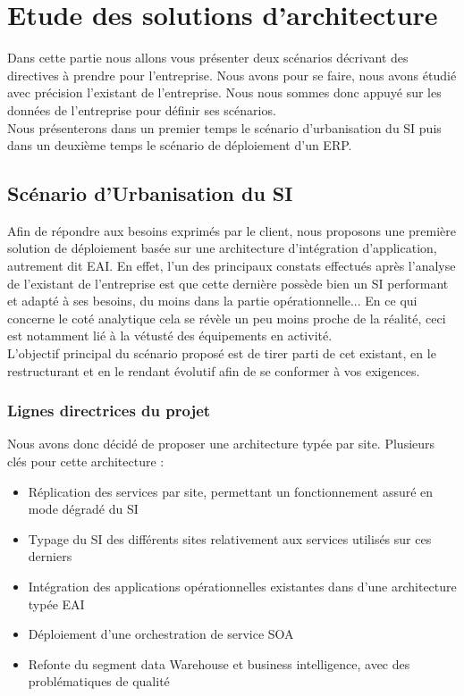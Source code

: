\section{Etude des solutions d'architecture}

Dans cette partie nous allons vous présenter deux scénarios décrivant des directives à prendre pour l'entreprise. Nous avons pour se faire, nous avons étudié avec précision l'existant de l'entreprise. Nous nous sommes donc appuyé sur les données de l'entreprise pour définir ses scénarios. \\
Nous présenterons dans un premier temps le scénario d'urbanisation du SI puis dans un deuxième temps le scénario de déploiement d'un ERP.

\subsection{Scénario d'Urbanisation du SI}

Afin de répondre aux besoins exprimés par le client, nous proposons une première solution de déploiement basée sur une architecture d'intégration d'application, autrement dit EAI. 
En effet, l'un des principaux constats effectués après l'analyse de l'existant de l'entreprise est que cette dernière possède bien un SI performant et adapté à ses besoins, du moins dans la partie opérationnelle... En ce qui concerne le coté analytique cela se révèle un peu moins proche de la réalité, ceci est notamment lié à la vétusté des équipements en activité.\\ 
L'objectif principal du scénario proposé est de tirer parti de cet existant, en le restructurant et en le rendant évolutif afin de se conformer à vos exigences.

\subsubsection{Lignes directrices du projet}

Nous avons donc décidé de proposer une architecture typée par site. Plusieurs clés pour cette architecture :\\

\begin{itemize}
\item Réplication des services par site, permettant un fonctionnement assuré en mode dégradé du SI
\item Typage du SI des différents sites relativement aux services utilisés sur ces derniers
\item Intégration des applications opérationnelles existantes dans d'une architecture typée EAI
\item Déploiement d'une orchestration de service SOA
\item Refonte du segment data Warehouse et business intelligence, avec des problématiques de qualité\\
\end{itemize}


